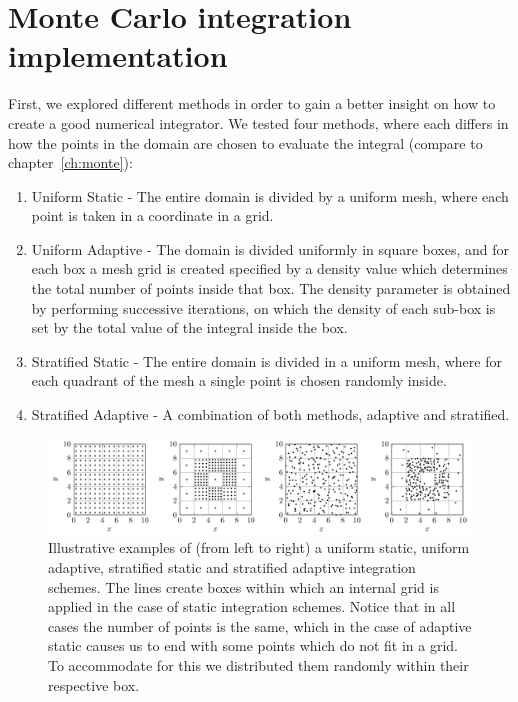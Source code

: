 \section{Monte Carlo integration implementation}
\label{ch:monte_app}

First, we explored different methods in order to gain a better insight on how to create a good numerical integrator. We tested four methods, where each differs in how the points in the domain are chosen to evaluate the integral (compare to chapter~\ref{ch:monte}):
\begin{enumerate}
  \item Uniform Static - The entire domain is divided by a uniform mesh, where each point is taken in a coordinate in a grid.
  \item Uniform Adaptive - The domain is divided uniformly in square boxes, and for each box a mesh grid is created
  specified by a density value which determines the total number of points inside that box. The density parameter
  is obtained by performing successive iterations, on which the density of each sub-box is set by the total value of the integral inside
  the box.
  \item Stratified Static - The entire domain is divided in a uniform mesh, where for each quadrant of the mesh
  a single point is chosen randomly inside.
  \item Stratified Adaptive - A combination of both methods, adaptive and stratified.
\end{enumerate}
\begin{figure}[th]
  \begin{center}
    \includegraphics[scale=0.9]{graphs/BoxPlotter.pdf}
	\caption{
	  	Illustrative examples of (from left to right) a uniform static, uniform adaptive, stratified static and stratified adaptive integration schemes. The lines create boxes within which an internal grid is applied in the case of static integration schemes. Notice that in all cases the number of points is the same, which in the case of adaptive static causes us to end with some points which do not fit in a grid. To accommodate for this we distributed them randomly within their respective box.
  	}
	\label{fig:BoxPlotter}
  \end{center}
\end{figure}

